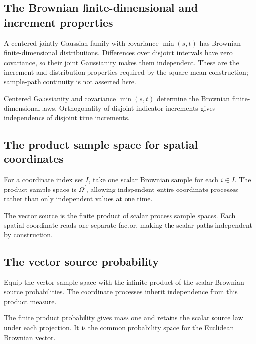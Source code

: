 \documentclass[11pt,a4paper]{article}
\begin{document}
\subsection{\texorpdfstring{The Brownian finite-dimensional and increment properties}{The Brownian finite-dimensional and increment properties}}


A centered jointly Gaussian family with covariance \(\min(s,t)\) has Brownian finite-dimensional distributions. Differences over disjoint intervals have zero covariance, so their joint Gaussianity makes them independent. These are the increment and distribution properties required by the square-mean construction; sample-path continuity is not asserted here.



Centered Gaussianity and covariance \(\min(s,t)\) determine the Brownian finite-dimensional laws. Orthogonality of disjoint indicator increments gives independence of disjoint time increments.


\subsection{\texorpdfstring{The product sample space for spatial coordinates}{The product sample space for spatial coordinates}}


For a coordinate index set \(I\), take one scalar Brownian sample for each \(i\in I\). The product sample space is \(\Omega^I\), allowing independent entire coordinate processes rather than only independent values at one time.



The vector source is the finite product of scalar process sample spaces. Each spatial coordinate reads one separate factor, making the scalar paths independent by construction.


\subsection{\texorpdfstring{The vector source probability}{The vector source probability}}


Equip the vector sample space with the infinite product of the scalar Brownian source probabilities. The coordinate processes inherit independence from this product measure.



The finite product probability gives mass one and retains the scalar source law under each projection. It is the common probability space for the Euclidean Brownian vector.
\end{document}
